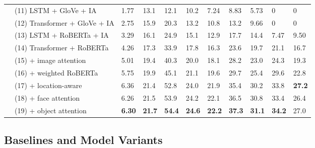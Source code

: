 \begin{table*}[t]
\begin{tabularx}{\textwidth}{llXXX XX XX XX}
		\midrule
		\midrule
		\multirow{8}{*}{\rotatebox[origin=c]{90}{NYTimes800k}}
		 & (11) LSTM + GloVe + IA                            & 1.77          & 13.1          & 12.1          & 10.2          & 7.24          & 8.83          & 5.73          & 0             & 0             \\
		 & (12) Transformer + GloVe + IA                     & 2.75          & 15.9          & 20.3          & 13.2          & 10.8          & 13.2          & 9.66          & 0             & 0             \\
		 & (13) LSTM + RoBERTa + IA                          & 3.29          & 16.1          & 24.9          & 15.1          & 12.9          & 17.7          & 14.4          & 7.47          & 9.50          \\
		\cmidrule{2-11}
		 & (14) Transformer + RoBERTa                        & 4.26          & 17.3          & 33.9          & 17.8          & 16.3          & 23.6          & 19.7          & 21.1          & 16.7          \\
		 & (15) \quad + image attention                      & 5.01          & 19.4          & 40.3          & 20.0          & 18.1          & 28.2          & 23.0          & 24.3          & 19.3          \\
		 & (16) \quad\quad + weighted RoBERTa                & 5.75          & 19.9          & 45.1          & 21.1          & 19.6          & 29.7          & 25.4          & 29.6          & 22.8          \\
		 & (17) \quad\quad\quad + location-aware             & 6.36          & 21.4          & 52.8          & 24.0          & 21.9          & 35.4          & 30.2          & 33.8          & \textbf{27.2} \\
		 & (18) \quad\quad\quad\quad + face attention        & 6.26          & 21.5          & 53.9          & 24.2          & 22.1          & 36.5          & 30.8          & 33.4          & 26.4          \\
		 & (19) \quad\quad\quad\quad\quad + object attention & \textbf{6.30} & \textbf{21.7} & \textbf{54.4} & \textbf{24.6} & \textbf{22.2} & \textbf{37.3} & \textbf{31.1} & \textbf{34.2} & 27.0          \\

		\bottomrule
	\end{tabularx}
\end{table*}


\subsection{Baselines and Model Variants}

